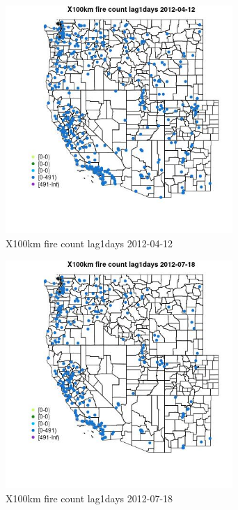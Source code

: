 \begin{figure} 
\centering  
\includegraphics[width=0.77\textwidth]{Code_Outputs/Report_ML_input_PM25_Step4_part_e_de_duplicated_aves_compiled_2019-05-14wNAs_MapObsX100km_fire_count_lag1days2012-04-12.jpg} 
\caption{\label{fig:Report_ML_input_PM25_Step4_part_e_de_duplicated_aves_compiled_2019-05-14wNAsMapObsX100km_fire_count_lag1days2012-04-12}X100km fire count lag1days 2012-04-12} 
\end{figure} 
 

\begin{figure} 
\centering  
\includegraphics[width=0.77\textwidth]{Code_Outputs/Report_ML_input_PM25_Step4_part_e_de_duplicated_aves_compiled_2019-05-14wNAs_MapObsX100km_fire_count_lag1days2012-07-18.jpg} 
\caption{\label{fig:Report_ML_input_PM25_Step4_part_e_de_duplicated_aves_compiled_2019-05-14wNAsMapObsX100km_fire_count_lag1days2012-07-18}X100km fire count lag1days 2012-07-18} 
\end{figure} 
 

